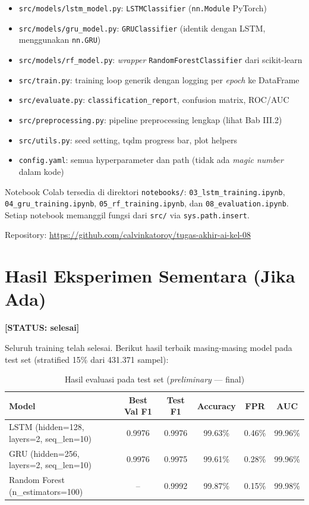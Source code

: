 \documentclass[11pt,a4paper,oneside]{report}
\newcommand{\statusbox}[1]{\textbf{[STATUS: #1]}}
\begin{document}
\begin{itemize}[leftmargin=*]
    \item \texttt{src/models/lstm\_model.py}: \texttt{LSTMClassifier} (\texttt{nn.Module} PyTorch)
    \item \texttt{src/models/gru\_model.py}: \texttt{GRUClassifier} (identik dengan LSTM, menggunakan \texttt{nn.GRU})
    \item \texttt{src/models/rf\_model.py}: \textit{wrapper} \texttt{RandomForestClassifier} dari scikit-learn
    \item \texttt{src/train.py}: training loop generik dengan logging per \textit{epoch} ke DataFrame
    \item \texttt{src/evaluate.py}: \texttt{classification\_report}, confusion matrix, ROC/AUC
    \item \texttt{src/preprocessing.py}: pipeline preprocessing lengkap (lihat Bab III.2)
    \item \texttt{src/utils.py}: seed setting, tqdm progress bar, plot helpers
    \item \texttt{config.yaml}: semua hyperparameter dan path (tidak ada \textit{magic number} dalam kode)
\end{itemize}

Notebook Colab tersedia di direktori \texttt{notebooks/}: \texttt{03\_lstm\_training.ipynb}, \texttt{04\_gru\_training.ipynb}, \texttt{05\_rf\_training.ipynb}, dan \texttt{08\_evaluation.ipynb}. Setiap notebook memanggil fungsi dari \texttt{src/} via \texttt{sys.path.insert}.

Repository: \url{https://github.com/calvinkatoroy/tugas-akhir-ai-kel-08}

\section{Hasil Eksperimen Sementara (Jika Ada)}

\statusbox{selesai}

Seluruh training telah selesai. Berikut hasil terbaik masing-masing model pada test set (stratified 15\% dari 431.371 sampel):

\begin{table}[h!]
\centering
\caption{Hasil evaluasi pada test set (\textit{preliminary} --- final)}
\label{tab:hasil-sementara}
\begin{tabular}{lccccc}
\toprule
\textbf{Model} & \textbf{Best Val F1} & \textbf{Test F1} & \textbf{Accuracy} & \textbf{FPR} & \textbf{AUC} \\
\midrule
LSTM (hidden=128, layers=2, seq\_len=10) & 0.9976 & 0.9976 & 99.63\% & 0.46\% & 99.96\% \\
GRU (hidden=256, layers=2, seq\_len=10)  & 0.9976 & 0.9975 & 99.61\% & 0.28\% & 99.96\% \\
Random Forest (n\_estimators=100)        & --     & 0.9992 & 99.87\% & 0.15\% & 99.98\% \\
\bottomrule
\end{tabular}
\end{table}
\end{document}
